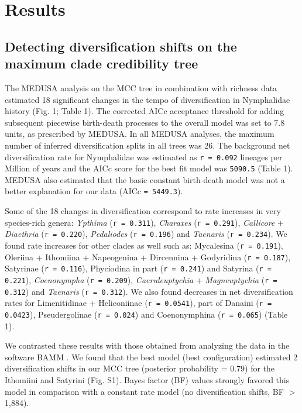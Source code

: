 \documentclass[10pt]{article}
\begin{document}
\section*{Results}

\subsection*{Detecting diversification shifts on the maximum clade
credibility tree}

The MEDUSA analysis on the MCC tree in combination with richness data
estimated 18 significant changes in the tempo of diversification in Nymphalidae
history (Fig. 1; Table 1). The corrected AICc acceptance threshold for
adding subsequent piecewise birth-death processes to the overall model
was set to 7.8 units, as prescribed by MEDUSA. In all MEDUSA analyses,
the maximum number of inferred diversification splits in all trees was
26. The background net diversification rate for Nymphalidae was
estimated as \texttt{r = 0.092} lineages per Million of years and the
AICc score for the best fit model was \texttt{5090.5} (Table 1). MEDUSA
also estimated that the basic constant birth-death model was not a
better explanation for our data (AICc \texttt{= 5449.3}).

Some of the 18 changes in diversification correspond to rate increases
in very species-rich genera: \emph{Ypthima} (\texttt{r = 0.311}),
\emph{Charaxes} (\texttt{r = 0.291}), \emph{Callicore} +
\emph{Diaethria} (\texttt{r = 0.220}), \emph{Pedaliodes}
(\texttt{r = 0.196}) and \emph{Taenaris} (\texttt{r = 0.234}). We found
rate increases for other clades as well such as: Mycalesina
(\texttt{r = 0.191}), Oleriina + Ithomiina + Napeogenina + Dircennina +
Godyridina (\texttt{r = 0.187}), Satyrinae (\texttt{r = 0.116}),
Phyciodina in part (\texttt{r = 0.241}) and Satyrina
(\texttt{r = 0.221}), \emph{Coenonympha} (\texttt{r = 0.209}),
\emph{Caeruleuptychia} + \emph{Magneuptychia} (\texttt{r = 0.312}) and
\emph{Taenaris} (\texttt{r = 0.312}). We also found decreases in net
diversification rates for Limenitidinae + Heliconiinae
(\texttt{r = 0.0541}), part of Danaini (\texttt{r = 0.0423}),
Pseudergolinae (\texttt{r = 0.024}) and Coenonymphina
(\texttt{r = 0.065}) (Table 1).

We contrasted these results with those obtained from analyzing the data in
the software BAMM \cite{rabosky2014}. We found 
that the best model (best configuration) estimated 2 diversification shifts in
our MCC tree (posterior probability = 0.79) for the Ithomiini
and Satyrini (Fig. S1). Bayes factor (BF) values strongly 
favored this model in comparison with a constant rate model (no diversification
shifts, BF $>$ 1,884).
\end{document}
